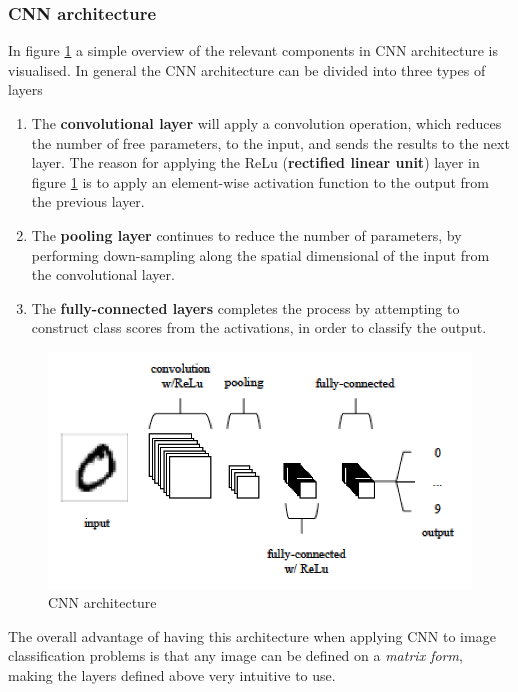 \subsubsection{CNN architecture}
In figure \ref{fig:cnn} a simple overview of the relevant components in CNN architecture is visualised. In general the CNN architecture can be divided into three types of layers
\begin{enumerate}
    \item The \textbf{convolutional layer} will apply a convolution operation, which reduces the number of free parameters, to the input, and sends the results to the next layer. The reason for applying the ReLu (\textbf{rectified linear unit}) layer in figure \ref{fig:cnn} is to apply an element-wise activation function to the output from the previous layer. 
    \item The \textbf{pooling layer} continues to reduce the number of parameters, by performing down-sampling along the spatial dimensional of the input from the convolutional layer. 
    \item The \textbf{fully-connected layers} completes the process by attempting to construct class scores from the activations, in order to classify the output. 
\end{enumerate}
\begin{figure}[H]
    \centering
    \includegraphics[width=0.7\linewidth]{images/chap2/CNN.png}
    \caption{CNN architecture \cite{Keiron}}
    \label{fig:cnn}
\end{figure}
The overall advantage of having this architecture when applying CNN to image classification problems is that any image can be defined on a \textit{matrix form}, making the layers defined above very intuitive to use. 
